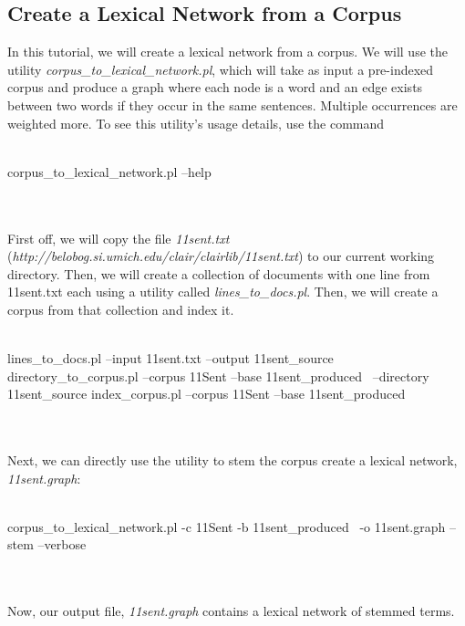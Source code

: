 \subsection{Create a Lexical Network from a Corpus}
In this tutorial, we will create a lexical network from a corpus. We will use the utility \emph{corpus\_to\_lexical\_network.pl}, which will take as input a pre-indexed corpus and produce a graph where each node is a word and an edge exists between two words if they occur in the same sentences.  Multiple occurrences are weighted more. To see this utility's usage details, use the command
\\
\\
\begin{boxedverbatim}
corpus_to_lexical_network.pl --help
\end{boxedverbatim}
\\
\\
First off, we will copy the file \emph{11sent.txt} (\emph{http://belobog.si.umich.edu/clair/clairlib/11sent.txt}) to our current working directory. Then, we will create a collection of documents with one line from 11sent.txt each using a utility called \emph{lines\_to\_docs.pl}. Then, we will create a corpus from that collection and index it.
\\
\\
\begin{boxedverbatim}

lines_to_docs.pl --input 11sent.txt --output 11sent_source
directory_to_corpus.pl --corpus 11Sent --base 11sent_produced \
 --directory 11sent_source
index_corpus.pl --corpus 11Sent --base 11sent_produced

\end{boxedverbatim}
\\
\\
Next, we can directly use the utility to stem the corpus create a lexical network, \emph{11sent.graph}:
\\
\\
\begin{boxedverbatim}
corpus_to_lexical_network.pl -c 11Sent -b 11sent_produced \
 -o 11sent.graph --stem --verbose
\end{boxedverbatim}
\\
\\
Now, our output file, \emph{11sent.graph} contains a lexical network of stemmed terms.
